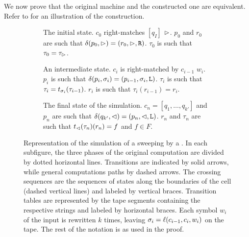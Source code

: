 We now prove that the original machine and the constructed one are equivalent.
Refer to  for an illustration of the construction.
\begin{figure}
	\centering
	\begin{subfigure}[b]{0.32\textwidth}
		\centering
		
		\caption{The initial state.
			$c_0$ right-matches $[q_I]$ \wrt $\rhd$.
			$p_0$ and $r_0$ are such that $\delta(p_0,\rhd)=(r_0,\rhd,\mathtt R)$.
			$\tau_0$ is such that $\tau_0=\tau_\rhd$.\newline}
		\label{sfig:swepkDLAtoNFA-start}
	\end{subfigure}
	\hfill
	\begin{subfigure}[b]{0.32\textwidth}
		\centering
		
		\caption{An intermediate state.
			$c_i$ is right-matched by $c_{i-1}$ \wrt $w_i$.
			$p_i$ is such that $\delta(p_i,\sigma_i)=(p_{i-1},\sigma_i,\mathtt L)$.
			$\tau_i$ is such that $\tau_i=t_{\sigma_i}(\tau_{i-1})$.
			$r_i$ is such that $\tau_i(r_{i-1})=r_i$.}
		\label{sfig:swepkDLAtoNFA-mid}
	\end{subfigure}
	\hfill
	\begin{subfigure}[b]{0.33\textwidth}
		\centering
		
		\caption{The final state of the simulation.
		$c_n=[q_1,\dots,q_{k'}]$ and $p_n$ are such that $\delta(q_{k'},\lhd)=(p_n,\lhd,\mathtt L)$.
		$r_n$ and $\tau_n$ are such that $t_\lhd(\tau_n)(r_n)=f$ and $f\in F$.\newline}
		\label{sfig:swepkDLAtoNFA-end}
	\end{subfigure}

	\caption[Three cases in the simulation of a sweeping \kDLA by a \ONFA.]{Representation of the simulation of a sweeping \kDLA by a \ONFA.
		In each subfigure, the three phases of the original computation are divided by dotted horizontal lines.
		Transitions are indicated by solid arrows, while general computations paths by dashed arrows.
		The crossing sequences are the sequences of states along the boundaries of the cell (dashed vertical lines) and labeled by vertical braces.
		Transition tables are represented by the tape segments containing the respective strings and labeled by horizontal braces.
		Each symbol $w_i$ of the input is rewritten $k$ times, leaving $\sigma_i=\ell(c_{i-1},c_i,w_i)$ on the tape.
		The rest of the notation is as used in the proof.}
	\label{fig:swepkDLAtoNFA}
\end{figure}

